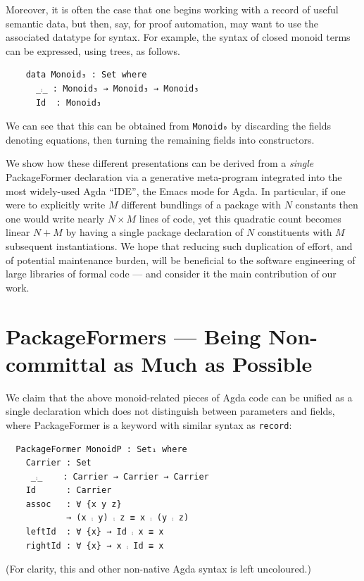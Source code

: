 \documentclass[sigplan,screen]{acmart}
\begin{document}
Moreover, it is often the case that one begins working with a record of useful
semantic data, but then, say, for proof automation, may want to use the associated
datatype for syntax. For example, the syntax of closed monoid terms can be expressed,
using trees, as follows.
\begin{verbatim}
    data Monoid₃ : Set where
      _⨾_ : Monoid₃ → Monoid₃ → Monoid₃
      Id  : Monoid₃
\end{verbatim}
\noindent
We can see that this can be
obtained from \texttt{Monoid₀} by discarding the
fields denoting equations, then turning the remaining fields into constructors.

We show how these different
presentations can be derived from a \emph{single}
\textsf{\upshape PackageFormer} declaration
via a generative meta-program integrated into the
most widely-used Agda “IDE”, the Emacs mode for Agda.
In particular,
if one were to explicitly write \(M\) different bundlings of a package
with \(N\) constants then one would write nearly \(N × M\) lines of code,
yet this quadratic count becomes linear \(N + M\) by having a single
package declaration of \(N\) constituents with \(M\) subsequent instantiations.
We hope that reducing such duplication of effort, and of potential maintenance
burden, will be beneficial to the software engineering of large libraries
of formal code --- and consider it the main contribution of our work.

\section{\textsf{\upshape PackageFormer}s --- Being Non-committal as Much as Possible}
\label{sec:org9a007a7}
We claim that the above monoid-related pieces of Agda code
can be unified as a single declaration
which does not distinguish between parameters and fields,
where \textsf{PackageFormer} is a keyword with similar syntax as \texttt{record}:

\begin{verbatim}
  PackageFormer MonoidP : Set₁ where
    Carrier : Set
     _⨾_    : Carrier → Carrier → Carrier
    Id      : Carrier
    assoc   : ∀ {x y z}
            → (x ⨾ y) ⨾ z ≡ x ⨾ (y ⨾ z)
    leftId  : ∀ {x} → Id ⨾ x ≡ x
    rightId : ∀ {x} → x ⨾ Id ≡ x
\end{verbatim}

\noindent
\begin{small}
(For clarity, this and other non-native Agda syntax is left uncoloured.)
\end{small}
\end{document}

